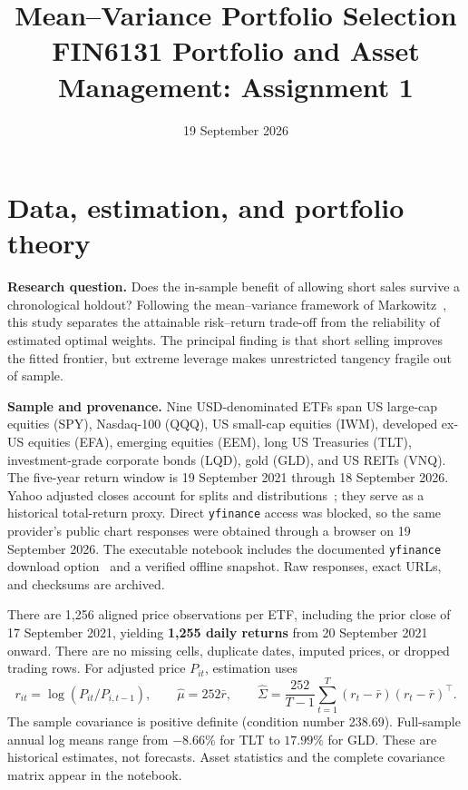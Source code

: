\documentclass[10pt,a4paper]{article}
\title{\vspace{-1.8em}\textbf{Mean--Variance Portfolio Selection}\\[-2pt]
\large FIN6131 Portfolio and Asset Management: Assignment 1}
\author{}
\date{19 September 2026}
\newcommand{\Sig}{\widehat{\Sigma}}
\begin{document}
\maketitle
\vspace{-2.4em}

\section{Data, estimation, and portfolio theory}
\textbf{Research question.} Does the in-sample benefit of allowing short sales survive a chronological holdout? Following the mean--variance framework of Markowitz~\cite{source1}, this study separates the attainable risk--return trade-off from the reliability of estimated optimal weights. The principal finding is that short selling improves the fitted frontier, but extreme leverage makes unrestricted tangency fragile out of sample.

\textbf{Sample and provenance.} Nine USD-denominated ETFs span US large-cap equities (SPY), Nasdaq-100 (QQQ), US small-cap equities (IWM), developed ex-US equities (EFA), emerging equities (EEM), long US Treasuries (TLT), investment-grade corporate bonds (LQD), gold (GLD), and US REITs (VNQ). The five-year return window is 19 September 2021 through 18 September 2026. Yahoo adjusted closes account for splits and distributions~\cite{source3}; they serve as a historical total-return proxy. Direct \texttt{yfinance} access was blocked, so the same provider's public chart responses were obtained through a browser on 19 September 2026. The executable notebook includes the documented \texttt{yfinance} download option~\cite{source2} and a verified offline snapshot. Raw responses, exact URLs, and checksums are archived.

There are 1,256 aligned price observations per ETF, including the prior close of 17 September 2021, yielding \textbf{1,255 daily returns} from 20 September 2021 onward. There are no missing cells, duplicate dates, imputed prices, or dropped trading rows. For adjusted price $P_{it}$, estimation uses
\[
 r_{it}=\log(P_{it}/P_{i,t-1}),\qquad
 \widehat\mu=252\bar r,\qquad
 \Sig=\frac{252}{T-1}\sum_{t=1}^{T}(r_t-\bar r)(r_t-\bar r)^\top.
\]
The sample covariance is positive definite (condition number 238.69). Full-sample annual log means range from $-8.66\%$ for TLT to $17.99\%$ for GLD. These are historical estimates, not forecasts. Asset statistics and the complete covariance matrix appear in the notebook.
\end{document}
